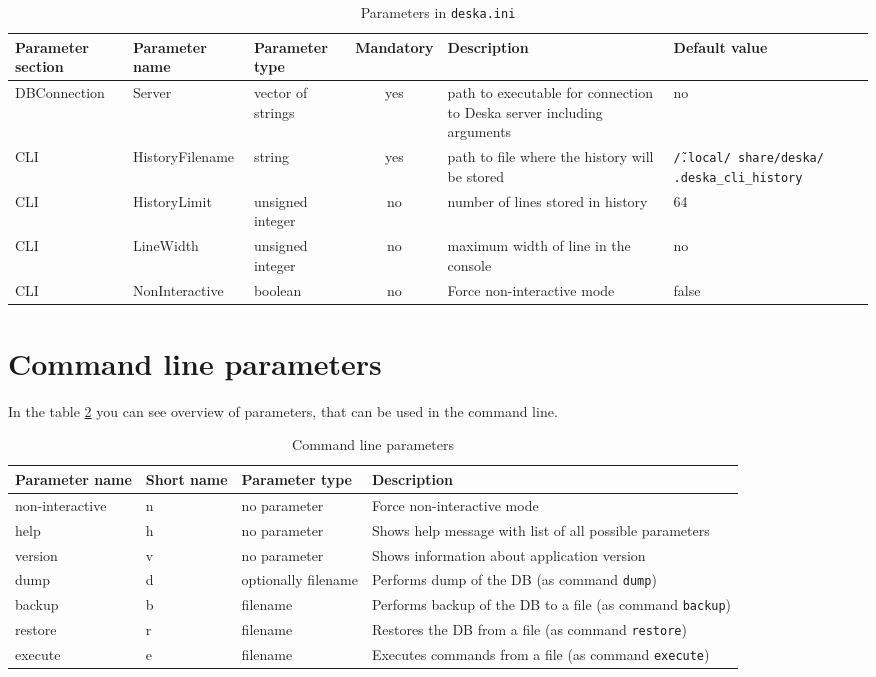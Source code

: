 \documentclass[deska]{subfiles}
\begin{document}
\begin{longtable}{ p{2.2cm} | l | p{1.5cm} | c | p{3.5cm} | p{2.5cm} }
    \caption{Parameters in {\tt deska.ini}} \\
    Parameter section & Parameter name & Parameter type & Mandatory & Description & Default value \\
    \hline
    \endhead
\label{tab:configfile}
    DBConnection & Server & vector of strings & yes & path to executable for connection to Deska server including arguments & no \\
    CLI & HistoryFilename & string & yes & path to file where the history will be stored & {\tt \~/.local/ share/deska/ .deska\_cli\_history} \\
    CLI & HistoryLimit & unsigned integer & no & number of lines stored in history & 64 \\
    CLI & LineWidth & unsigned integer & no & maximum width of line in the console & no \\
    CLI & NonInteractive & boolean & no & Force non-interactive mode & false \\
    \hline
\end{longtable}

\section{Command line parameters}

In the table \ref{tab:cmdlineparams} you can see overview of parameters, that can be used in the command line.

\begin{longtable}{ l | l | l | p{7cm} }
    \caption{Command line parameters} \\
    Parameter name & Short name & Parameter type & Description \\
    \hline
    \endhead
\label{tab:cmdlineparams}
    non-interactive & n & no parameter & Force non-interactive mode \\
    help & h & no parameter & Shows help message with list of all possible parameters \\
    version & v & no parameter & Shows information about application version \\
    dump & d & optionally filename & Performs dump of the DB (as command {\tt dump}) \\
    backup & b & filename & Performs backup of the DB to a file (as command {\tt backup}) \\
    restore & r & filename & Restores the DB from a file (as command {\tt restore}) \\
    execute & e & filename & Executes commands from a file (as command {\tt execute}) \\
    \hline
\end{longtable}
\end{document}
